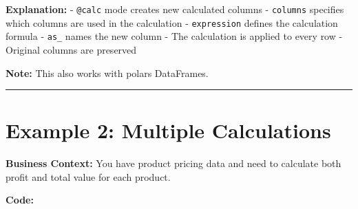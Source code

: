 \documentclass[
  letterpaper,
]{scrbook}
\begin{document}
\textbf{Explanation:} -
\texttt{\textquotesingle{}@calc\textquotesingle{}} mode creates new
calculated columns - \texttt{columns} specifies which columns are used
in the calculation - \texttt{expression} defines the calculation formula
- \texttt{as\_} names the new column - The calculation is applied to
every row - Original columns are preserved

\textbf{Note:} This also works with polars DataFrames.

\begin{center}\rule{0.5\linewidth}{0.5pt}\end{center}

\section{Example 2: Multiple
Calculations}\label{example-2-multiple-calculations}

\textbf{Business Context:} You have product pricing data and need to
calculate both profit and total value for each product.

\textbf{Code:}
\end{document}
